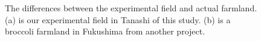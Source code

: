\begin{figure}[htb!]
  \begin{center}
  \end{center}
  \caption[The differences between the experimental field and actual farmland]{
    The differences between the experimental field and actual farmland. (a) is our experimental field in Tanashi of this study. (b) is a broccoli farmland in Fukushima from another project.
  }
  \label{fig:dis_pattern}
\end{figure}
